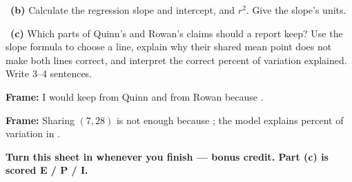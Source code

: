 \documentclass[11pt]{article}
\begin{document}
~\textbf{(b)} Calculate the regression slope and intercept, and $r^2$. Give the slope's units.\par
\workspace{1.0in}

~\textbf{(c)} Which parts of Quinn's and Rowan's claims should a report keep? Use the slope formula to choose a line, explain why their shared mean point does not make both lines correct, and interpret the correct percent of variation explained. Write 3--4 sentences.\par
\workspace{1.45in}

\begin{sentenceframebox}\raggedright\textbf{Frame:} I would keep \blank[1.6in] from Quinn and \blank[1.6in] from Rowan because \blank[1.7in].\end{sentenceframebox}

\begin{sentenceframebox}\raggedright\textbf{Frame:} Sharing $(7,28)$ is not enough because \blank[2.0in]; the model explains \blank[0.6in] percent of variation in \blank[1.4in].\end{sentenceframebox}

\textbf{Turn this sheet in whenever you finish --- bonus credit. Part (c) is scored E / P / I.}\par
\end{document}
